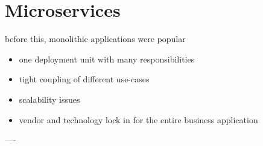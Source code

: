 \section{Microservices}

before this, monolithic applications were popular

\begin{itemize}
	\item one deployment unit with many responsibilities
	\item tight coupling of different use-cases
	\item scalability issues
	\item vendor and technology lock in for the entire business application
\end{itemize}

----

